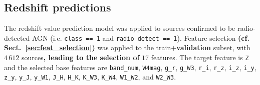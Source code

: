\documentclass{aa}
\begin{document}
\subsection{Redshift predictions}\label{sec:results_redshift}

The redshift value prediction model was applied to sources confirmed to be radio-detected AGN (i.e. \texttt{class~==~1} and \texttt{radio\_detect~==~1}).
Feature selection \textbf{(cf. Sect.~\ref{sec:feat_selection})} was applied to the train+\textbf{validation} subset, with $4\,612$ sources\textbf{, leading to the selection of} $17$ features. The target feature is \verb|Z| and the selected base features are \verb|band_num|, \verb|W4mag|, \verb|g_r|, \verb|g_W3|, \verb|r_i|, \verb|r_z|, \verb|i_z|, \verb|i_y|, \verb|z_y|, \verb|y_J|, \verb|y_W1|, \verb|J_H|, \verb|H_K|, \verb|K_W3|, \verb|K_W4|, \verb|W1_W2|, and \verb|W2_W3|.
\\
\begin{table}
\setlength{\tabcolsep}{3pt}
\caption{Results of initial fit for redshift value prediction}             %
\label{table:fit_redshift_models}      %
\centering                          %
\end{table}
\end{document}
